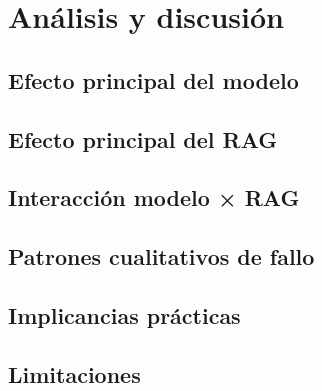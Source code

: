 \chapter{Análisis y discusión}\label{cap:analisis}


\section{Efecto principal del modelo}

\section{Efecto principal del RAG}

\section{Interacción modelo × RAG}

\section{Patrones cualitativos de fallo}

\section{Implicancias prácticas}

\section{Limitaciones}
